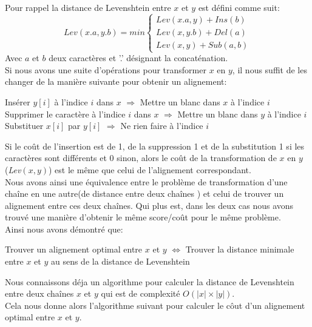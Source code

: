 \documentclass{article}
\begin{document}
Pour rappel la distance de Levenshtein entre $x$ et $y$ est défini comme suit:
\begin{equation*}
	Lev(x.a,y.b)= min
		\begin{cases}
			Lev(x.a,y) + Ins(b)\\
			Lev(x,y.b) + Del(a)\\
			Lev(x,y) + Sub(a,b)
		\end{cases}
\end{equation*}
Avec $a$ et $b$ deux caractères et '.' désignant la concaténation.\\

Si nous avons une suite d'opérations pour transformer $x$ en $y$, il nous suffit de
les changer de la manière suivante pour obtenir un alignement:
\begin{center}
	Insérer $y[i]$ à l'indice $i$ dans $x$  $\Rightarrow$ Mettre un blanc dans $x$ à l'indice $i$ \\
	Supprimer le caractère à l'indice $i$ dans $x$ $\Rightarrow$ Mettre un blanc dans $y$ à l'indice $i$\\
	Substituer $x[i]$ par $y[i]$ $\Rightarrow$ Ne rien faire à l'indice $i$ 
\end{center}

Si le coût de l'insertion est de 1, de la suppression 1 et de la substitution 1 si
les caractères sont différents et 0 sinon, alors le coût de la transformation
de $x$ en $y$ (\textit{Lev}$(x,y)$) est le même que celui de l'alignement correspondant.\\

Nous avons ainsi une équivalence entre le problème de transformation d'une
chaîne en une autre(de distance entre deux chaînes ) et celui de trouver un 
alignement entre ces deux chaînes.
Qui plus est, dans les deux cas nous avons trouvé une manière d'obtenir le même
score/coût pour le même problème.\\
Ainsi nous avons démontré que:
\begin{center}
	Trouver un alignement optimal entre $x$ et $y$ $\Leftrightarrow$ Trouver
	la distance minimale entre $x$ et $y$ au sens de la distance de Levenshtein 
\end{center}

Nous connaissons déja un algorithme pour calculer la distance de Levenshtein
entre deux chaînes $x$ et $y$ qui est de complexité $O( \lvert x \rvert \times
\lvert y \rvert )$.\\
Cela nous donne alors l'algorithme suivant pour calculer le côut d'un
alignement optimal entre $x$ et $y$.
\end{document}
